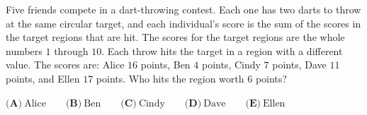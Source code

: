 Five friends compete in a dart-throwing contest. Each one has two darts to throw at the same circular target, and each individual's score is the sum of the scores in the target regions that are hit. The scores for the target regions are the whole numbers $1$ through $10$. Each throw hits the target in a region with a different value. The scores are: Alice $16$ points, Ben $4$ points, Cindy $7$ points, Dave $11$ points, and Ellen $17$ points. Who hits the region worth $6$ points?

$\textbf{(A)}\ \text{Alice}\qquad\textbf{(B)}\ \text{Ben}\qquad\textbf{(C)}\ \text{Cindy}\qquad\textbf{(D)}\ \text{Dave}\qquad\textbf{(E)}\ \text{Ellen}$
